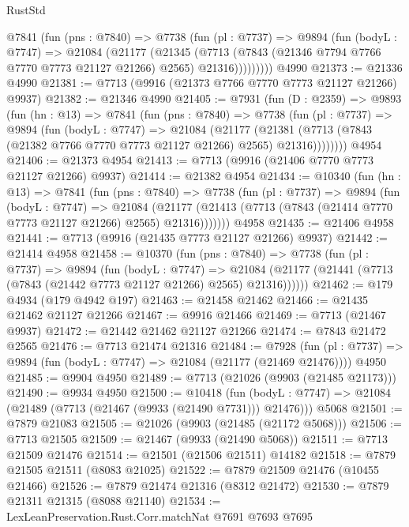 \begin{lexlean}{RustStd}
\begin{coremodule}
        @7841
          (fun (pns : @7840) =>
          @7738
            (fun (pl : @7737) =>
            @9894
              (fun (bodyL : @7747) =>
              @21084
                (@21177
                  (@21345
                    (@7713
                      (@7843 (@21346 @7794 @7766 @7770 @7773 @21127 @21266) @2565)
                      @21316)))))))))
    @4990
@21373 := @21336 @4990
@21381 := @7713 (@9916 (@21373 @7766 @7770 @7773 @21127 @21266) @9937)
@21382 := @21346 @4990
@21405 := @7931
    (fun (D : @2359) =>
    @9893
      (fun (hn : @13) =>
      @7841
        (fun (pns : @7840) =>
        @7738
          (fun (pl : @7737) =>
          @9894
            (fun (bodyL : @7747) =>
            @21084
              (@21177
                (@21381 (@7713 (@7843 (@21382 @7766 @7770 @7773 @21127 @21266) @2565) @21316))))))))
    @4954
@21406 := @21373 @4954
@21413 := @7713 (@9916 (@21406 @7770 @7773 @21127 @21266) @9937)
@21414 := @21382 @4954
@21434 := @10340
    (fun (hn : @13) =>
    @7841
      (fun (pns : @7840) =>
      @7738
        (fun (pl : @7737) =>
        @9894
          (fun (bodyL : @7747) =>
          @21084
            (@21177 (@21413 (@7713 (@7843 (@21414 @7770 @7773 @21127 @21266) @2565) @21316)))))))
    @4958
@21435 := @21406 @4958
@21441 := @7713 (@9916 (@21435 @7773 @21127 @21266) @9937)
@21442 := @21414 @4958
@21458 := @10370
    (fun (pns : @7840) =>
    @7738
      (fun (pl : @7737) =>
      @9894
        (fun (bodyL : @7747) =>
        @21084 (@21177 (@21441 (@7713 (@7843 (@21442 @7773 @21127 @21266) @2565) @21316))))))
@21462 := @179 @4934 (@179 @4942 @197)
@21463 := @21458 @21462
@21466 := @21435 @21462 @21127 @21266
@21467 := @9916 @21466
@21469 := @7713 (@21467 @9937)
@21472 := @21442 @21462 @21127 @21266
@21474 := @7843 @21472 @2565
@21476 := @7713 @21474 @21316
@21484 := @7928
    (fun (pl : @7737) => @9894 (fun (bodyL : @7747) => @21084 (@21177 (@21469 @21476))))
    @4950
@21485 := @9904 @4950
@21489 := @7713 (@21026 (@9903 (@21485 @21173)))
@21490 := @9934 @4950
@21500 := @10418
    (fun (bodyL : @7747) => @21084 (@21489 (@7713 (@21467 (@9933 (@21490 @7731))) @21476)))
    @5068
@21501 := @7879 @21083
@21505 := @21026 (@9903 (@21485 (@21172 @5068)))
@21506 := @7713 @21505
@21509 := @21467 (@9933 (@21490 @5068))
@21511 := @7713 @21509 @21476
@21514 := @21501 (@21506 @21511) @14182
@21518 := @7879 @21505 @21511 (@8083 @21025)
@21522 := @7879 @21509 @21476 (@10455 @21466)
@21526 := @7879 @21474 @21316 (@8312 @21472)
@21530 := @7879 @21311 @21315 (@8088 @21140)
@21534 := LexLeanPreservation.Rust.Corr.matchNat @7691 @7693 @7695

\end{coremodule}
\end{lexlean}
